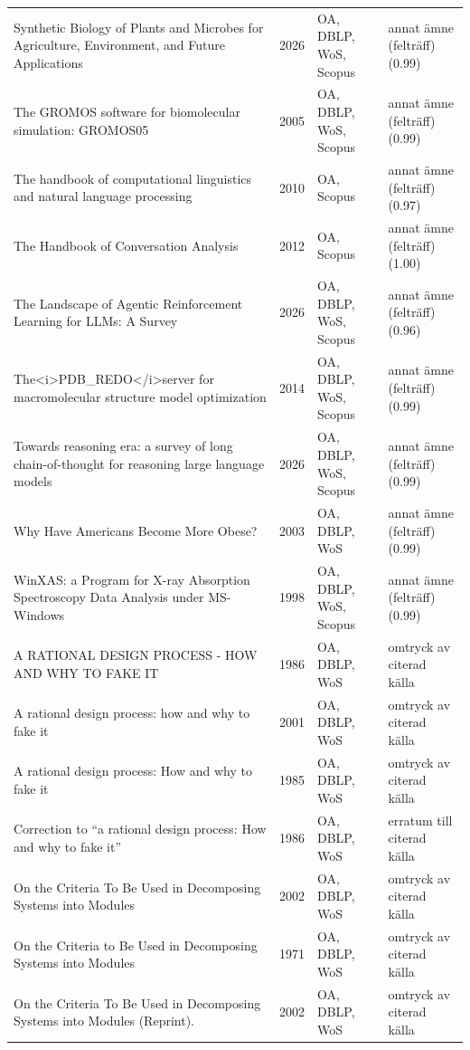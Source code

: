 \begin{longtable}{@{}%
  >{\raggedright\arraybackslash}p{}c%
  >{\raggedright\arraybackslash}p{}%
  >{\raggedright\arraybackslash}p{}@{}}
Synthetic Biology of Plants and Microbes for Agriculture, Environment, and Future Applications & 2026 & OA, DBLP, WoS, Scopus & annat ämne (felträff) (0.99) \\
The GROMOS software for biomolecular simulation: GROMOS05 & 2005 & OA, DBLP, WoS, Scopus & annat ämne (felträff) (0.99) \\
The handbook of computational linguistics and natural language processing & 2010 & OA, Scopus & annat ämne (felträff) (0.97) \\
The Handbook of Conversation Analysis & 2012 & OA, Scopus & annat ämne (felträff) (1.00) \\
The Landscape of Agentic Reinforcement Learning for LLMs: A Survey & 2026 & OA, DBLP, WoS, Scopus & annat ämne (felträff) (0.96) \\
The<i>PDB\_REDO</i>server for macromolecular structure model optimization & 2014 & OA, DBLP, WoS, Scopus & annat ämne (felträff) (0.99) \\
Towards reasoning era: a survey of long chain-of-thought for reasoning large language models & 2026 & OA, DBLP, WoS, Scopus & annat ämne (felträff) (0.99) \\
Why Have Americans Become More Obese? & 2003 & OA, DBLP, WoS & annat ämne (felträff) (0.99) \\
WinXAS: a Program for X-ray Absorption Spectroscopy Data Analysis under MS-Windows & 1998 & OA, DBLP, WoS, Scopus & annat ämne (felträff) (0.99) \\
A RATIONAL DESIGN PROCESS - HOW AND WHY TO FAKE IT & 1986 & OA, DBLP, WoS & omtryck av citerad källa \\
A rational design process: how and why to fake it & 2001 & OA, DBLP, WoS & omtryck av citerad källa \\
A rational design process: How and why to fake it & 1985 & OA, DBLP, WoS & omtryck av citerad källa \\
Correction to ``a rational design process: How and why to fake it'' & 1986 & OA, DBLP, WoS & erratum till citerad källa \\
On the Criteria To Be Used in Decomposing Systems into Modules & 2002 & OA, DBLP, WoS & omtryck av citerad källa \\
On the Criteria to Be Used in Decomposing Systems into Modules & 1971 & OA, DBLP, WoS & omtryck av citerad källa \\
On the Criteria To Be Used in Decomposing Systems into Modules (Reprint). & 2002 & OA, DBLP, WoS & omtryck av citerad källa \\
\end{longtable}
\endgroup
